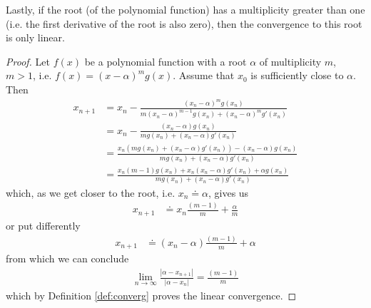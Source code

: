 \documentclass[
  digital, %
  table,   %
  nolof,     %
  nolot,     %
	draft, %
]{fithesis3}
\begin{document}
Lastly, if the root (of the polynomial function) has a multiplicity greater than one (i.e. the first derivative of the root is also zero), then the convergence to this root is only linear.
\begin{proof}
Let $f(x)$ be a polynomial function with a root $\alpha$ of multiplicity $m$, $m > 1$, i.e. $f(x) = (x-\alpha)^{m}g(x)$. Assume that $x_{0}$ is sufficiently close to $\alpha$. Then
\begin{align}
x_{n+1} &= x_{n} - \frac{(x_{n} - \alpha)^{m}g(x_{n})}{m(x_{n}-\alpha)^{m-1}g(x_{n}) + (x_{n}-\alpha)^{m}g'(x_{n})} \\
&= x_{n} - \frac{(x_{n} - \alpha)g(x_{n})}{mg(x_{n}) + (x_{n}-\alpha)g'(x_{n})} \\
&= \frac{x_{n}(mg(x_{n}) + (x_{n}-\alpha)g'(x_{n})) - (x_{n} - \alpha)g(x_{n})}{mg(x_{n}) + (x_{n}-\alpha)g'(x_{n})} \\
&= \frac{x_{n}(m - 1)g(x_{n}) + x_{n}(x_{n}-\alpha)g'(x_{n}) + {\alpha}g(x_{n})}{mg(x_{n}) + (x_{n}-\alpha)g'(x_{n})}
\end{align}
which, as we get closer to the root, i.e. $x_{n} \doteq \alpha$, gives us
\begin{align}
x_{n+1} &\doteq x_{n}\frac{(m - 1)}{m}+\frac{\alpha}{m}
\end{align}
or put differently
\begin{align}
x_{n+1} &\doteq (x_{n}-\alpha)\frac{(m - 1)}{m}+\alpha
\end{align}
from which we can conclude
\begin{align}
\lim_{n\to\infty}\frac{\left|\alpha - x_{n+1}\right|}{\left|\alpha-x_{n}\right|} = \frac{(m - 1)}{m}
\end{align}
which by Definition \ref{def:converg} proves the linear convergence.
\end{proof}
\end{document}

